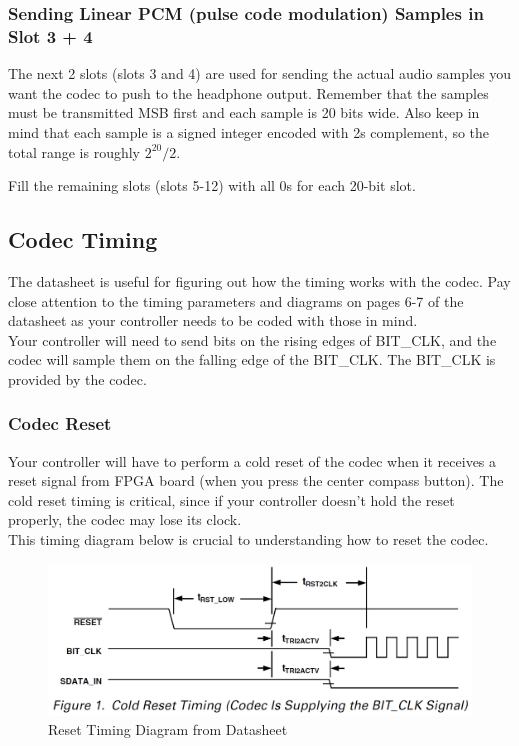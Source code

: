 \documentclass[11pt]{article}
\begin{document}
\subsubsection{Sending Linear PCM (pulse code modulation) Samples in Slot 3 + 4}
The next 2 slots (slots 3 and 4) are used for sending the actual audio samples you want the codec to push to the headphone output. Remember that the samples must be transmitted MSB first and each sample is 20 bits wide. Also keep in mind that each sample is a signed integer encoded with 2s complement, so the total range is roughly $ 2^{20} /2 $.

Fill the remaining slots (slots 5-12) with all 0s for each 20-bit slot.

\subsection{Codec Timing}
The datasheet is useful for figuring out how the timing works with the codec. Pay close attention to the timing parameters and diagrams on pages 6-7 of the datasheet as your controller needs to be coded with those in mind. \\

Your controller will need to send bits on the rising edges of BIT\_CLK, and the codec will sample them on the falling edge of the BIT\_CLK. The BIT\_CLK is provided by the codec.

\subsubsection{Codec Reset}
Your controller will have to perform a cold reset of the codec when it receives a reset signal from FPGA board (when you press the center compass button). The cold reset timing is critical, since if your controller doesn't hold the reset properly, the codec may lose its clock.\\

This timing diagram below is crucial to understanding how to reset the codec.\\

\begin{figure}[hbt]
	\begin{center}
		\includegraphics[width=6in]{ac97_codec_timing}
		\caption{Reset Timing Diagram from Datasheet}
	\end{center}
\end{figure}
\end{document}
